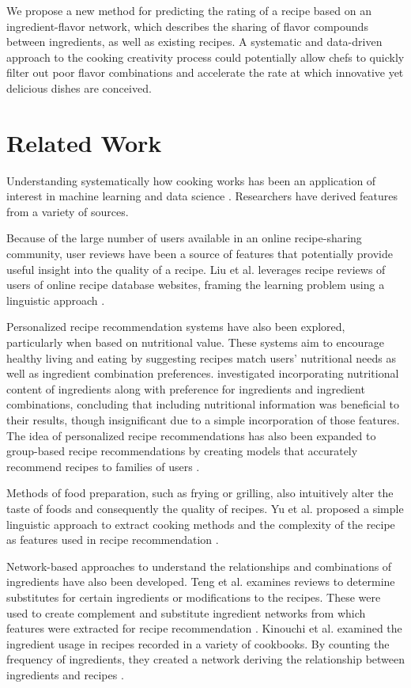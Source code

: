 \documentclass{article}
\begin{document}
We propose a new method for predicting the rating of a recipe based on an ingredient-flavor network, which describes the sharing of flavor compounds between ingredients, as well as existing recipes. A systematic and data-driven approach to the cooking creativity process could potentially allow chefs to quickly filter out poor flavor combinations and accelerate the rate at which innovative yet delicious dishes are conceived.

\section{Related Work}
Understanding systematically how cooking works has been an application of interest in machine learning and data science \cite{harvey13,jagithyala14,liu14,yu13,teng12}. Researchers have derived features from a variety of sources.

Because of the large number of users available in an online recipe-sharing community, user reviews have been a source of features that potentially provide useful insight into the quality of a recipe. Liu et al. leverages recipe reviews of users of online recipe database websites, framing the learning problem using a linguistic approach . 

Personalized recipe recommendation systems have also been explored, particularly when based on nutritional value. These systems aim to encourage healthy living and eating by suggesting recipes match users' nutritional needs as well as ingredient combination preferences. \cite{harvey13} investigated incorporating nutritional content of ingredients along with preference for ingredients and ingredient combinations, concluding that including nutritional information was beneficial to their results, though insignificant due to a simple incorporation of those features. The idea of personalized recipe recommendations has also been expanded to group-based recipe recommendations by creating models that accurately recommend recipes to families of users \cite{berkovsky10}.

Methods of food preparation, such as frying or grilling, also intuitively alter the taste of foods and consequently the quality of recipes. Yu et al. proposed a simple linguistic approach to extract cooking methods and the complexity of the recipe as features used in recipe recommendation .

Network-based approaches to understand the relationships and combinations of ingredients have also been developed. Teng et al. examines reviews to determine substitutes for certain ingredients or modifications to the recipes. These were used to create complement and substitute ingredient networks from which features were extracted for recipe recommendation . Kinouchi et al. examined the ingredient usage in recipes recorded in a variety of cookbooks. By counting the frequency of ingredients, they created a network deriving the relationship between ingredients and recipes .
\end{document}
